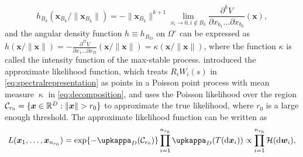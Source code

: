 \documentclass[lineno]{biometrika}
\begin{document}
\begin{equation}\label{eq:angular_density}
	h_{B_k}\left(\bm x_{B_k} / \|\bm x_{B_k}\| \right) = -\|\bm x_{B_k}\|^{k+1}\lim_{x_i\to 0, i\notin B_k} \frac{\partial^k V}{\partial x_{b_1}\dots\partial x_{b_k}} (\bm x),
\end{equation}
%
and the angular density function $h \equiv h_{B_D}$ on $\Omega^\circ$ can be expressed as $h(\bm x/\|\bm x\|) = -\frac{\partial^D V}{\partial x_1\dots\partial x_D}(\bm x/\|\bm x\|) = \kappa(\bm x/\|\bm x\|)$, where the function $\kappa$ is called  the intensity function of the max-stable process. 
%
\cite{Coles.Tawn:1994} introduced the approximate likelihood function, which treats $R_iW_i(s)$ in \eqref{eq:spectralrepresentation} as 
points in a Poisson point process with mean measure $\upkappa$ in \eqref{eq:decomposition}, and uses the Poisson likelihood over the region $\calC_{r_0} = \{\bm x\in\mathbb R^D: \|\bm x\|> r_0\}$ to approximate the true likelihood, where $r_0$ is a large enough threshold. The approximate likelihood function can be written as 
%
\begin{equation}
\label{eq:angular_likelihood_1}
L(\bm x_1,\dots,\bm x_{n_{r_0}}) = \exp\{-\upkappa_D(\calC_{r_0})\}\prod_{i=1}^{n_{r_0}}\upkappa_D(T(\text{d}\bm x_i)) \propto \prod_{i=1}^{n_{r_0}}\mathcal H(\text{d}\bm w_i),    
\end{equation}
\end{document}

